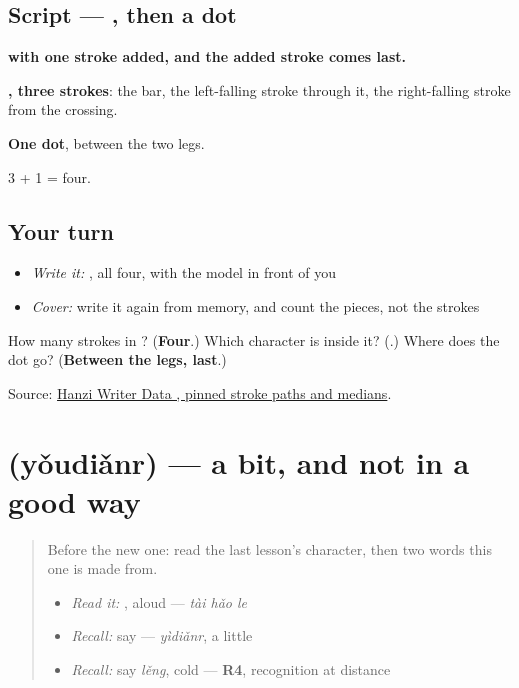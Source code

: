 \subsection*{Script — , then a dot}

\begin{quote}
\end{quote}

\textbf{ with one stroke added, and the added stroke comes last.}

\textbf{, three strokes}: the bar, the left-falling stroke through it, the right-falling stroke from the crossing.

\textbf{One dot}, between the two legs.

3 + 1 = four.

\subsection*{Your turn}
\begin{itemize}
\raggedright
  \item \emph{Write it:} , all four, with the model in front of you
  \item \emph{Cover:} write it again from memory, and count the pieces, not the strokes
\end{itemize}

\begin{tcolorbox}[breakable,colback=teal!4,colframe=teal!35!black,title={Before you move on}]
How many strokes in ? (\textbf{Four}.) Which character is inside it? (\textbf{}.) Where does the dot go? (\textbf{Between the legs, last}.)

Source: \href{https://raw.githubusercontent.com/chanind/hanzi-writer-data/68d10a4b21150cae5e1ebbd223eed289cf32d90c/data/\%E5\%A4\%AA.json}{Hanzi Writer Data , pinned stroke paths and medians}.
\end{tcolorbox}
\section[\texorpdfstring{\zh{有点儿} (yǒudiǎnr)}{有点儿 (yǒudiǎnr)}]{ (yǒudiǎnr) — a bit, and not in a good way}

\label{lesson:ZH-C93-youdianr}



\begin{quote}
Before the new one: read the last lesson's character, then two words this one is made from.

\begin{itemize}
\raggedright
  \item \emph{Read it:} , aloud — \emph{tài hǎo le}
  \item \emph{Recall:} say  — \emph{yìdiǎnr}, a little
  \item \emph{Recall:} say \emph{lěng}, cold — \textbf{R4}, recognition at distance
\end{itemize}
\end{quote}

